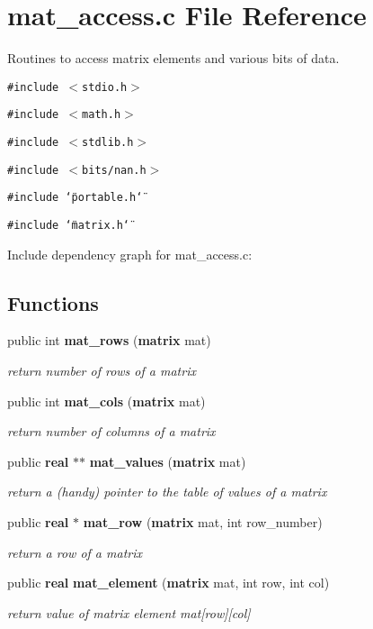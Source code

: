 \section{mat\_\-access.c File Reference}
\label{mat__access_8c}
Routines to access matrix elements and various bits of data. 


{\tt \#include $<$stdio.h$>$}\par
{\tt \#include $<$math.h$>$}\par
{\tt \#include $<$stdlib.h$>$}\par
{\tt \#include $<$bits/nan.h$>$}\par
{\tt \#include \char`\"{}portable.h\char`\"{}}\par
{\tt \#include \char`\"{}matrix.h\char`\"{}}\par


Include dependency graph for mat\_\-access.c:\subsection*{Functions}
\begin{CompactItemize}
\item 
public int {\bf mat\_\-rows} ({\bf matrix} mat)
\begin{CompactList}\small\item\em return number of rows of a matrix\item\end{CompactList}\item 
public int {\bf mat\_\-cols} ({\bf matrix} mat)
\begin{CompactList}\small\item\em return number of columns of a matrix\item\end{CompactList}\item 
public {\bf real} $\ast$$\ast$ {\bf mat\_\-values} ({\bf matrix} mat)
\begin{CompactList}\small\item\em return a (handy) pointer to the table of values of a matrix\item\end{CompactList}\item 
public {\bf real} $\ast$ {\bf mat\_\-row} ({\bf matrix} mat, int row\_\-number)
\begin{CompactList}\small\item\em return a row of a matrix\item\end{CompactList}\item 
public {\bf real} {\bf mat\_\-element} ({\bf matrix} mat, int row, int col)
\begin{CompactList}\small\item\em return value of matrix element mat[row][col]\item\end{CompactList}\end{CompactItemize}


